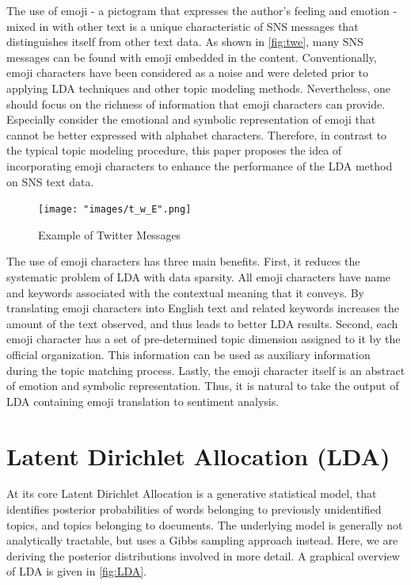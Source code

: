 \documentclass[]{article}
\begin{document}
The use of emoji - a pictogram that expresses the author's feeling and
emotion - mixed in with other text is a unique characteristic of SNS
messages that distinguishes itself from other text data. As shown in
\autoref{fig:twe}, many SNS messages can be found with emoji embedded in
the content. Conventionally, emoji characters have been considered as a
noise and were deleted prior to applying LDA techniques and other topic
modeling methods. Nevertheless, one should focus on the richness of
information that emoji characters can provide. Especially consider the
emotional and symbolic representation of emoji that cannot be better
expressed with alphabet characters. Therefore, in contrast to the
typical topic modeling procedure, this paper proposes the idea of
incorporating emoji characters to enhance the performance of the LDA
method on SNS text data.

\begin{figure}[htbp]
\centering
\texttt{[image: "images/t\_w\_E".png]}
\caption{Example of Twitter Messages \label{fig:twe}}
\end{figure}

The use of emoji characters has three main benefits. First, it reduces
the systematic problem of LDA with data sparsity. All emoji characters
have name and keywords associated with the contextual meaning that it
conveys. By translating emoji characters into English text and related
keywords increases the amount of the text observed, and thus leads to
better LDA results. Second, each emoji character has a set of
pre-determined topic dimension assigned to it by the official
organization. This information can be used as auxiliary information
during the topic matching process. Lastly, the emoji character itself is
an abstract of emotion and symbolic representation. Thus, it is natural
to take the output of LDA containing emoji translation to sentiment
analysis.

\section{Latent Dirichlet Allocation
(LDA)}\label{latent-dirichlet-allocation-lda}

At its core Latent Dirichlet Allocation is a generative statistical
model, that identifies posterior probabilities of words belonging to
previously unidentified topics, and topics belonging to documents. The
underlying model is generally not analytically tractable, but uses a
Gibbs sampling approach instead. Here, we are deriving the posterior
distributions involved in more detail. A graphical overview of LDA is
given in \autoref{fig:LDA}.
\end{document}
